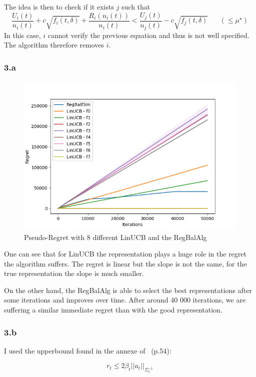 \documentclass[a4paper]{article}
\begin{document}
The idea is then to check if it exists $j$ such that
\begin{equation*}
   \frac{U_i(t)}{n_i(t)} + c\sqrt{f_i(t, \delta)} + \frac{R_i(n_i(t))}{n_i(t)} <  \frac{U_j(t)}{n_j(t)} - c\sqrt{f_j(t, \delta)} \;\;\;\;\;\; (\le \mu^\star)
\end{equation*}
In this case, $i$ cannot verify the previous equation and thus is not well specified. The algorithm therefore removes $i$.

\subsubsection*{3.a}


\begin{figure}[h!]
   \includegraphics[width=0.8\linewidth]{images/regret}
   \caption{Pseudo-Regret with 8 different LinUCB and the RegBalAlg}
   \label{fig:regret}
\end{figure}

One can see that for LinUCB the representation plays a huge role in the regret the algorithm suffers. The regret is linear but the slope
is not the same, for the true representation the slope is much smaller.

On the other hand, the RegBalAlg is able to select the best representations after some iterations and improves over time. After around 40 000
iterations, we are suffering a similar immediate regret than with the good representation.

\subsubsection*{3.b}

I used the upperbound found in the annexe of~\citep{pacchiano2020regret} (p.54):

\begin{equation*}
   r_t \le 2 \beta_t ||a_t||_{\Sigma_t^{-1}}
\end{equation*}
\end{document}
